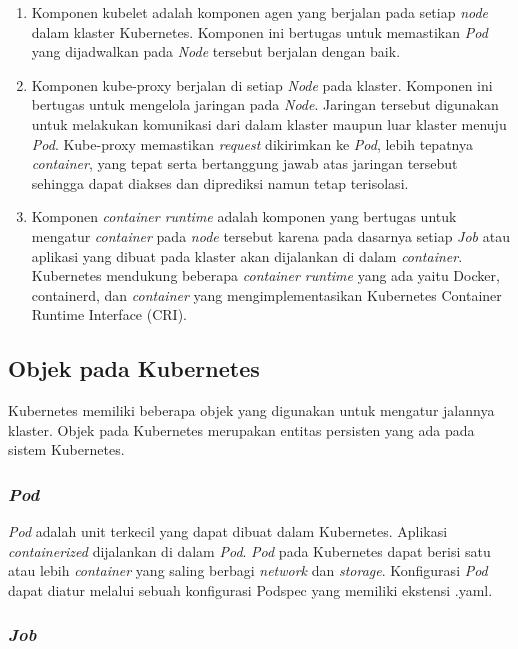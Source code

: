 \begin{enumerate}[itemsep=-0.2cm, topsep=-0.3cm]
  \item{Komponen kubelet adalah komponen agen yang berjalan pada
    setiap \emph{node} dalam klaster Kubernetes. Komponen ini bertugas untuk
    memastikan \emph{Pod} yang dijadwalkan pada \emph{Node} tersebut berjalan
    dengan baik.
  }
  \item{Komponen kube-proxy berjalan di setiap \emph{Node} pada
    klaster. Komponen ini bertugas untuk mengelola jaringan pada \emph{Node}.
    Jaringan tersebut digunakan untuk melakukan komunikasi dari dalam klaster
    maupun luar klaster menuju \emph{Pod}. Kube-proxy memastikan \emph{request}
    dikirimkan ke \emph{Pod}, lebih tepatnya \emph{container}, yang tepat serta bertanggung
    jawab atas jaringan tersebut sehingga dapat diakses dan diprediksi namun tetap terisolasi.
  }
  \item{Komponen \emph{container runtime} adalah komponen yang bertugas
    untuk mengatur \emph{container} pada \emph{node} tersebut karena pada dasarnya setiap
    \emph{Job} atau aplikasi yang dibuat pada klaster akan dijalankan di dalam \emph{container}.
    Kubernetes mendukung beberapa \emph{container runtime} yang ada yaitu Docker, containerd, dan
    \emph{container} yang mengimplementasikan Kubernetes Container Runtime Interface (CRI).
  }
\end{enumerate}

\subsection{Objek pada Kubernetes}

Kubernetes memiliki beberapa objek yang digunakan untuk mengatur jalannya
klaster. Objek pada Kubernetes merupakan entitas persisten yang ada pada sistem
Kubernetes. 

\subsubsection{\emph{Pod}}

\emph{Pod} adalah unit terkecil yang dapat dibuat dalam Kubernetes. Aplikasi
\emph{containerized} dijalankan di dalam \emph{Pod}. \emph{Pod} pada Kubernetes
dapat berisi satu atau lebih \emph{container} yang saling berbagi \emph{network}
dan \emph{storage}. Konfigurasi \emph{Pod} dapat diatur melalui sebuah konfigurasi
Podspec yang memiliki ekstensi .yaml.

\subsubsection{\emph{Job}}

